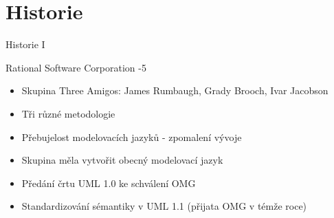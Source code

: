 \section{Historie}




\begin{frame}{Historie I}

\onslide<+->Rational Software Corporation 
\newline
{}-5 
\begin{itemize}
    \item Skupina Three Amigos: James Rumbaugh, Grady Brooch, Ivar Jacobson
    \item<+->Tři různé metodologie
\end{itemize}                     

\begin{itemize}
    \item Přebujelost modelovacích jazyků - zpomalení vývoje
    \item<+->Skupina měla vytvořit obecný modelovací jazyk
\end{itemize}      

\begin{itemize}
    \item Předání črtu UML 1.0 ke schválení OMG
    \item<+->Standardizování sémantiky v UML 1.1 (přijata OMG v témže roce)
\end{itemize}         
	
\end{frame}


